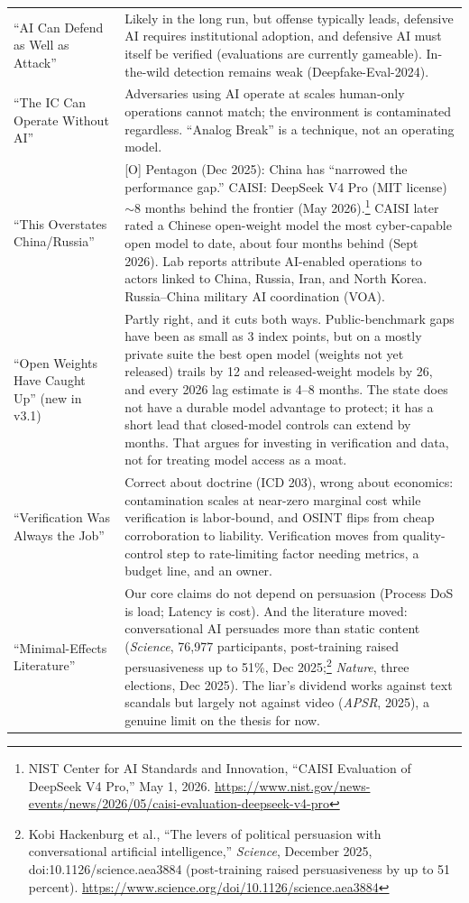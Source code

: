 \documentclass[11pt,letterpaper]{article}
\begin{document}
{\begin{longtable}{L{4.3cm}L{12.05cm}}
\addlinespace
``AI Can Defend as Well as Attack'' & Likely in the long run, but offense typically leads, defensive AI requires institutional adoption, and defensive AI must itself be verified (evaluations are currently gameable). In-the-wild detection remains weak (Deepfake-Eval-2024). \\
\addlinespace
``The IC Can Operate Without AI'' & Adversaries using AI operate at scales human-only operations cannot match; the environment is contaminated regardless. ``Analog Break'' is a technique, not an operating model. \\
\addlinespace
``This Overstates China/Russia'' & [O] Pentagon (Dec 2025): China has ``narrowed the performance gap.'' CAISI: DeepSeek V4 Pro (MIT license) $\sim$8 months behind the frontier (May 2026).\footnote{NIST Center for AI Standards and Innovation, ``CAISI Evaluation of DeepSeek V4 Pro,'' May 1, 2026. \url{https://www.nist.gov/news-events/news/2026/05/caisi-evaluation-deepseek-v4-pro}} CAISI later rated a Chinese open-weight model the most cyber-capable open model to date, about four months behind (Sept 2026). Lab reports attribute AI-enabled operations to actors linked to China, Russia, Iran, and North Korea. Russia--China military AI coordination (VOA). \\
\addlinespace
``Open Weights Have Caught Up'' (new in v3.1) & Partly right, and it cuts both ways. Public-benchmark gaps have been as small as 3 index points, but on a mostly private suite the best open model (weights not yet released) trails by 12 and released-weight models by 26, and every 2026 lag estimate is 4--8 months. The state does not have a durable model advantage to protect; it has a short lead that closed-model controls can extend by months. That argues for investing in verification and data, not for treating model access as a moat. \\
\addlinespace
``Verification Was Always the Job'' & Correct about doctrine (ICD 203), wrong about economics: contamination scales at near-zero marginal cost while verification is labor-bound, and OSINT flips from cheap corroboration to liability. Verification moves from quality-control step to rate-limiting factor needing metrics, a budget line, and an owner. \\
\addlinespace
``Minimal-Effects Literature'' & Our core claims do not depend on persuasion (Process DoS is load; Latency is cost). And the literature moved: conversational AI persuades more than static content (\textit{Science}, 76,977 participants, post-training raised persuasiveness up to 51\%, Dec 2025;\footnote{Kobi Hackenburg et al., ``The levers of political persuasion with conversational artificial intelligence,'' \textit{Science}, December 2025, doi:10.1126/science.aea3884 (post-training raised persuasiveness by up to 51 percent). \url{https://www.science.org/doi/10.1126/science.aea3884}} \textit{Nature}, three elections, Dec 2025). The liar's dividend works against text scandals but largely not against video (\textit{APSR}, 2025), a genuine limit on the thesis for now. \\

\end{longtable}}
\end{document}
